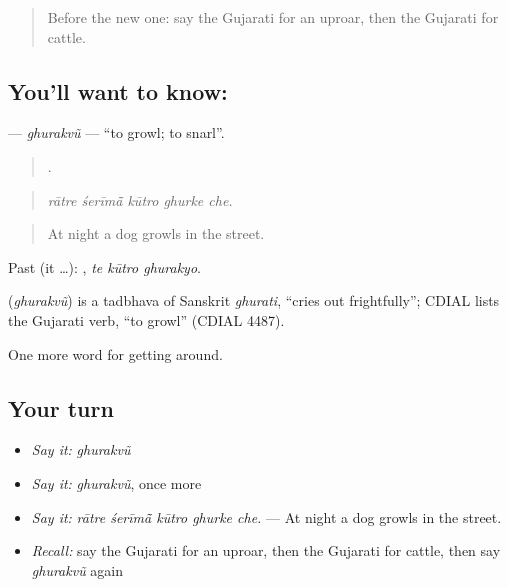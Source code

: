 \label{lesson:GU-C421-ghurakvu}



\begin{quote}
Before the new one: say the Gujarati for an uproar, then the Gujarati for cattle.
\end{quote}

\subsection*{You'll want to know: }
\textbf{} — \emph{ghurakvũ} — \textquotedblleft{}to growl; to snarl\textquotedblright{}.

\begin{quote}
    .
\end{quote}

\begin{quote}
\emph{rātre śerīmā̃ kūtro ghurke che.}
\end{quote}

\begin{quote}
At night a dog growls in the street.
\end{quote}

Past (it …):   , \emph{te kūtro ghurakyo}.

\begin{cousinweb}
\textbf{} (\emph{ghurakvũ}) is a tadbhava of Sanskrit \emph{ghurati}, \textquotedblleft{}cries out frightfully\textquotedblright{}; CDIAL lists the Gujarati verb, \textquotedblleft{}to growl\textquotedblright{} (CDIAL 4487).
\end{cousinweb}

\begin{grammarlens}[title={What you've built}]
One more word for getting around.
\end{grammarlens}

\subsection*{Your turn}
\begin{itemize}
\raggedright
  \item \emph{Say it:} \emph{ghurakvũ}
  \item \emph{Say it:} \emph{ghurakvũ}, once more
  \item \emph{Say it:} \emph{rātre śerīmā̃ kūtro ghurke che.} — At night a dog growls in the street.
  \item \emph{Recall:} say the Gujarati for an uproar, then the Gujarati for cattle, then say \emph{ghurakvũ} again
\end{itemize}

